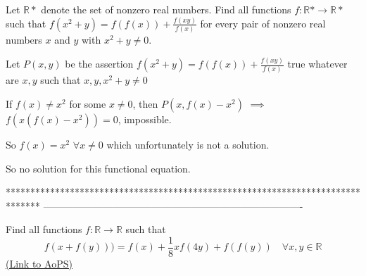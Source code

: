 \begin{solution}
	\begin{tcolorbox}Let $\mathbb{R}*$ denote the set of nonzero real numbers. Find all functions $f:\mathbb{R}* \rightarrow \mathbb{R}*$ such that $f(x^2+y)=f(f(x))+\frac{f(xy)}{f(x)}$ for every pair of nonzero real numbers $x$ and $y$ with $x^2+y \neq 0$.\end{tcolorbox}
Let $P(x,y)$ be the assertion $f(x^2+y)=f(f(x))+\frac{f(xy)}{f(x)}$ true whatever are $x,y$ such that $x,y,x^2+y\ne 0$

If $f(x)\ne x^2$ for some $x\ne 0$, then $P(x,f(x)-x^2)$ $\implies$  $f(x(f(x)-x^2))=0$, impossible.

So $f(x)=x^2$ $\forall x\ne 0$ which unfortunately is not a solution.

So no solution for this functional equation.
\end{solution}
*******************************************************************************
-------------------------------------------------------------------------------

\begin{problem}
	Find all functions $f:\mathbb{R}\rightarrow \mathbb{R}$ such that
\[f(x+f(y)))=f(x)+\frac{1}{8}xf(4y)+f(f(y))\quad \forall x,y\in\mathbb{R}\]
	\flushright \href{https://artofproblemsolving.com/community/c6h587306}{(Link to AoPS)}
\end{problem}




